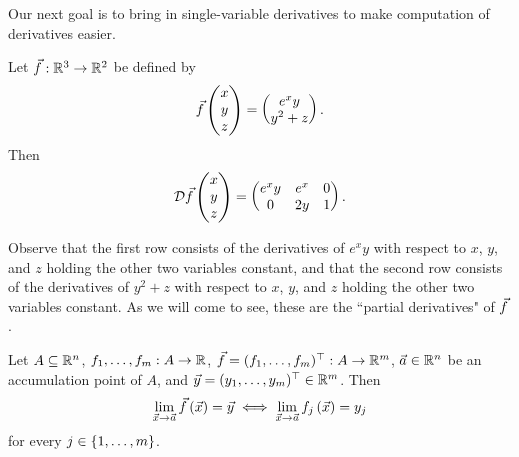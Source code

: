 \documentclass[main.tex]{subfiles}
\begin{document}
Our next goal is to bring in single-variable derivatives to make computation of derivatives easier.

\begin{example}
    Let $\vec{f} : \mathbb R^3 \to \mathbb R^2$ be defined by
    \[\vec{f}\begin{pmatrix}
        x \\ y \\ z
    \end{pmatrix} = \begin{pmatrix}
        e^xy \\ y^2 + z
    \end{pmatrix}.\]
    Then
    \[\mathcal{D}\vec{f}\begin{pmatrix}
        x \\ y \\ z
    \end{pmatrix} = \begin{pmatrix}
        e^xy & e^x & 0 \\
        0 & 2y & 1
    \end{pmatrix}.\]
\end{example}

Observe that the first row consists of the derivatives of $e^xy$ with respect to $x$, $y$, and $z$ holding the other two variables constant, and that the second row consists of the derivatives of $y^2 + z$ with respect to $x$, $y$, and $z$ holding the other two variables constant. As we will come to see, these are the ``partial derivatives" of $\vec{f}$.

\begin{proposition}
    Let $A\subseteq \mathbb R^n$, $f_1, \ldots , f_m : A \to \mathbb R$, $\vec{f} = (f_1, \ldots , f_m)^\top : A \to \mathbb R^m$, $\vec{a} \in \mathbb R^n$ be an accumulation point of $A$, and $\vec{y} = (y_1, \ldots , y_m)^\top\in \mathbb R^m$. Then
    \[\lim_{\vec{x}\to \vec{a}} \vec{f}\left( \vec{x} \right) = \vec{y} \iff \lim_{\vec{x}\to \vec{a}} f_j\left( \vec{x} \right) = y_j\]
    for every $j\in \left\{ 1, \ldots , m \right\}$.
\end{proposition}
\end{document}

